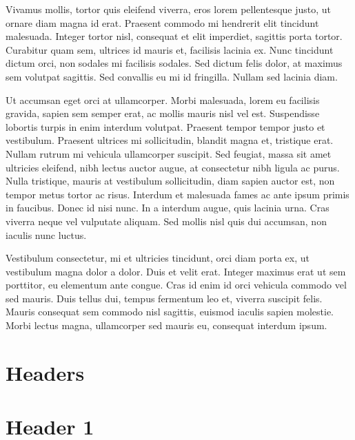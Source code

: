 \documentclass[
  letterpaper,
  DIV=11,
  numbers=noendperiod]{scrreprt}
\begin{document}
Vivamus mollis, tortor quis eleifend viverra, eros lorem pellentesque
justo, ut ornare diam magna id erat. Praesent commodo mi hendrerit elit
tincidunt malesuada. Integer tortor nisl, consequat et elit imperdiet,
sagittis porta tortor. Curabitur quam sem, ultrices id mauris et,
facilisis lacinia ex. Nunc tincidunt dictum orci, non sodales mi
facilisis sodales. Sed dictum felis dolor, at maximus sem volutpat
sagittis. Sed convallis eu mi id fringilla. Nullam sed lacinia diam.

Ut accumsan eget orci at ullamcorper. Morbi malesuada, lorem eu
facilisis gravida, sapien sem semper erat, ac mollis mauris nisl vel
est. Suspendisse lobortis turpis in enim interdum volutpat. Praesent
tempor tempor justo et vestibulum. Praesent ultrices mi sollicitudin,
blandit magna et, tristique erat. Nullam rutrum mi vehicula ullamcorper
suscipit. Sed feugiat, massa sit amet ultricies eleifend, nibh lectus
auctor augue, at consectetur nibh ligula ac purus. Nulla tristique,
mauris at vestibulum sollicitudin, diam sapien auctor est, non tempor
metus tortor ac risus. Interdum et malesuada fames ac ante ipsum primis
in faucibus. Donec id nisi nunc. In a interdum augue, quis lacinia urna.
Cras viverra neque vel vulputate aliquam. Sed mollis nisl quis dui
accumsan, non iaculis nunc luctus.

Vestibulum consectetur, mi et ultricies tincidunt, orci diam porta ex,
ut vestibulum magna dolor a dolor. Duis et velit erat. Integer maximus
erat ut sem porttitor, eu elementum ante congue. Cras id enim id orci
vehicula commodo vel sed mauris. Duis tellus dui, tempus fermentum leo
et, viverra suscipit felis. Mauris consequat sem commodo nisl sagittis,
euismod iaculis sapien molestie. Morbi lectus magna, ullamcorper sed
mauris eu, consequat interdum ipsum.


\chapter*{Headers}\label{headers}



\chapter*{Header 1}\label{header-1}
\end{document}
